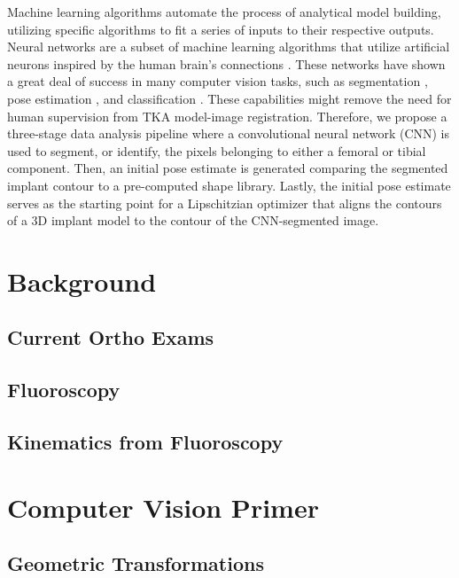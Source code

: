Machine learning algorithms automate the process of analytical model building, utilizing specific algorithms to fit a series of inputs to their respective outputs. Neural networks are a subset of machine learning algorithms that utilize artificial neurons inspired by the human brain’s connections \cite{marrEarlyProcessingVisual1976}. These networks have shown a great deal of success in many computer vision tasks, such as segmentation \cite{chanHistoSegNetSemanticSegmentation2019,wangDeepHighResolutionRepresentation2020,ronnebergerUNetConvolutionalNetworks2015}, pose estimation \cite{wuDeepGraphPose2020,kendallGeometricLossFunctions2017}, and classification \cite{krizhevskyImageNetClassificationDeep2017,qiPointNetDeepHierarchical2017,qiPointNetDeepLearning2017}. These capabilities might remove the need for human supervision from TKA model-image registration. Therefore, we propose a three-stage data analysis pipeline where a convolutional neural network (CNN) is used to segment, or identify, the pixels belonging to either a femoral or tibial component. Then, an initial pose estimate is generated comparing the segmented implant contour to a pre-computed shape library. Lastly, the initial pose estimate serves as the starting point for a Lipschitzian optimizer that aligns the contours of a 3D implant model to the contour of the CNN-segmented image.

\section{Background}
\subsection{Current Ortho Exams}

\subsection{Fluoroscopy}

\subsection{Kinematics from Fluoroscopy}


\section{Computer Vision Primer}
\label{sec:cv-primer}
\subsection{Geometric Transformations}
\label{sec:geometric-transformations}


